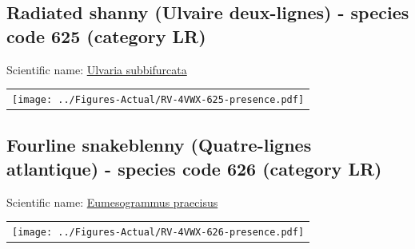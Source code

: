 \documentclass[12pt]{article}\usepackage[]{graphicx}\usepackage[]{color}
\begin{document}
\setcounter{figure}{0}

\hypertarget{sec:625}{%
\subsection{Radiated shanny (Ulvaire deux-lignes) - species code 625 (category LR)}\label{sec:625}}

  


Scientific name: \href{http://www.marinespecies.org/aphia.php?p=taxdetails\&id=159821}{Ulvaria subbifurcata} \newline
\begin{minipage}{1.0\textwidth}
 \begin{tabular}{c}
\texttt{[image: ../Figures-Actual/RV-4VWX-625-presence.pdf]} \\ 
\end{tabular} 
\end{minipage}
\clearpage

\renewcommand\thefigure{\thesubsection\Alph{figure}}

\setcounter{figure}{0}

\hypertarget{sec:626}{%
\subsection{Fourline snakeblenny (Quatre-lignes atlantique) - species code 626 (category LR)}\label{sec:626}}

  


Scientific name: \href{http://www.marinespecies.org/aphia.php?p=taxdetails\&id=159817}{Eumesogrammus praecisus} \newline
\begin{minipage}{1.0\textwidth}
 \begin{tabular}{c}
\texttt{[image: ../Figures-Actual/RV-4VWX-626-presence.pdf]} \\ 
\end{tabular} 
\end{minipage}
\clearpage

\renewcommand\thefigure{\thesubsection\Alph{figure}}
\end{document}

